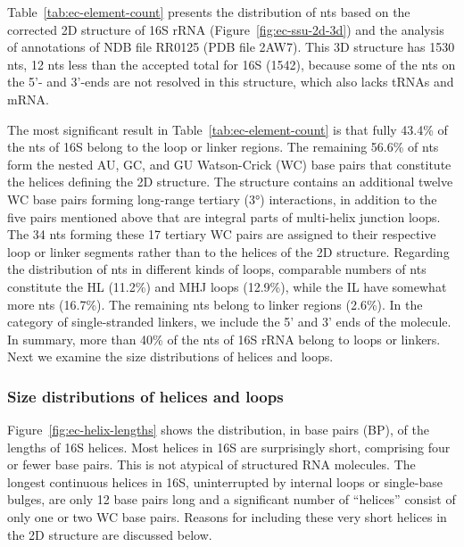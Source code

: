 Table~\ref{tab:ec-element-count} presents the distribution of nts based on the
corrected 2D structure of \EC{} 16S rRNA (Figure~\ref{fig:ec-ssu-2d-3d}) and the
analysis of annotations of NDB file RR0125 (PDB file 2AW7). This 3D structure
has 1530 nts, 12 nts less than the accepted total for \EC{} 16S (1542), because
some of the nts on the 5'- and 3'-ends are not resolved in this structure, which
also lacks tRNAs and mRNA\@. 

The most significant result in Table~\ref{tab:ec-element-count} is that fully
43.4\% of the nts of \EC{} 16S belong to the loop or linker regions. The
remaining 56.6\% of nts form the nested AU, GC, and GU Watson-Crick (WC) base
pairs that constitute the helices defining the 2D structure. The structure
contains an additional twelve WC base pairs forming long-range tertiary (3°)
interactions, in addition to the five pairs mentioned above that are integral
parts of multi-helix junction loops. The 34 nts forming these 17 tertiary WC
pairs are assigned to their respective loop or linker segments rather than to
the helices of the 2D structure. Regarding the distribution of nts in different
kinds of loops, comparable numbers of nts constitute the HL (11.2\%) and MHJ
loops (12.9\%), while the IL have somewhat more nts (16.7\%). The remaining nts
belong to linker regions (2.6\%). In the category of single-stranded linkers, we
include the 5' and 3' ends of the molecule. In summary, more than 40\% of the
nts of 16S rRNA belong to loops or linkers. Next we examine the size
distributions of helices and loops. 

\subsubsection{Size distributions of helices and loops}

Figure~\ref{fig:ec-helix-lengths} shows the distribution, in base pairs (BP), of
the lengths of 16S helices. Most helices in 16S are surprisingly short,
comprising four or fewer base pairs. This is not atypical of structured RNA
molecules. The longest continuous helices in \EC{} 16S, uninterrupted by
internal loops or single-base bulges, are only 12 base pairs long and a
significant number of ``helices'' consist of only one or two WC base pairs.
Reasons for including these very short helices in the 2D structure are discussed
below. 

